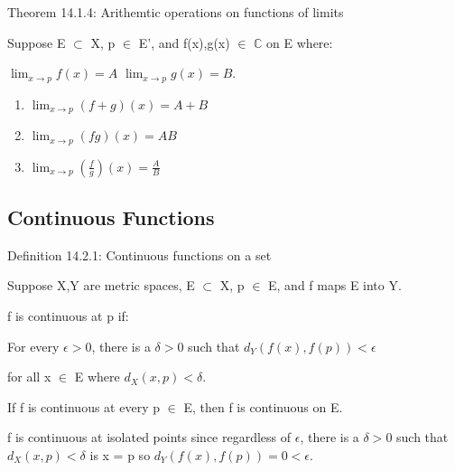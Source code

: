 { \color{red} Theorem 14.1.4: Arithemtic operations on functions of limits }

    \begin{adjustbox}{minipage=14cm, right, vspace=0.1cm 0cm}
        Suppose E $\subset$ X, p $\in$ E', and f(x),g(x) $\in$ $\mathbb{C}$ on E
        where:
        
        \hspace{1cm}
        $\lim_{x \rightarrow p} f(x) = A$
        \hspace{1cm}
        $\lim_{x \rightarrow p} g(x) = B$.
    \end{adjustbox}

    \vspace{0.2cm}

    \begin{enumerate}[label=(\alph*), leftmargin=2cm, itemsep=0.1cm]
        \item $\lim_{x \rightarrow p} (f+g)(x) = A+B$
        \item $\lim_{x \rightarrow p} (fg)(x) = AB$
        \item $\lim_{x \rightarrow p} (\frac{f}{g})(x) = \frac{A}{B}$
    \end{enumerate}





\subsection{ Continuous Functions }

{ \color{blue} Definition 14.2.1: Continuous functions on a set }

    \begin{adjustbox}{minipage=14cm, right, vspace=0.1cm 0cm}
        Suppose X,Y are metric spaces, E $\subset$ X, p $\in$ E, and
        f maps E into Y.

        f is continuous at p if:
        
        \begin{adjustbox}{minipage=13cm, right, vspace=0.1cm 0cm}
            For every $\epsilon > 0$, there is a
            $\delta > 0$ such that $d_Y(f(x),f(p)) < \epsilon$
            
            for all x $\in$ E where $d_X(x,p) < \delta$.
        \end{adjustbox}

        If f is continuous at every p $\in$ E, then f is continuous on E.

        f is continuous at isolated points since regardless of $\epsilon$,
        there is a $\delta > 0$ such that $d_X(x,p) < \delta$ is x = p so
        $d_Y(f(x),f(p)) = 0 < \epsilon$.
    \end{adjustbox}

